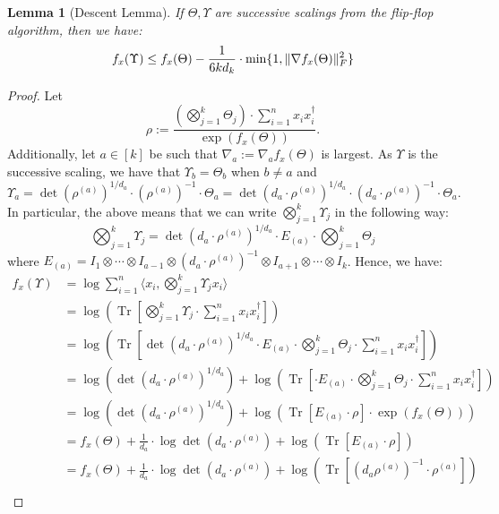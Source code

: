 \documentclass[aos]{imsart}
\newtheorem{lemma}[theorem]{Lemma}
\theoremstyle{definition}
\DeclareMathOperator{\tr}{Tr}
\DeclarePairedDelimiter{\norm}{\lVert}{\rVert}
\begin{document}
\begin{lemma}[Descent Lemma]\label{lem:tensor-descent-lemma}
	If $\Theta, \Upsilon$ are successive scalings from the flip-flop algorithm, then we have:
	$$ f_x(\Upsilon) \leq f_x(\Theta) - \dfrac{1}{6k d_k} \cdot \min\{1, \norm{\nabla f_x(\Theta)}_F^2\} $$
\end{lemma}

\begin{proof}
	Let
	$$\rho := \dfrac{\left( \bigotimes_{j=1}^k \Theta_j \right) \cdot \sum_{i=1}^n x_i x_i^\dagger}{\exp(f_x(\Theta))}.$$
	Additionally, let $a \in [k]$ be such that $\nabla_a := \nabla_a f_x(\Theta)$ is largest. As $\Upsilon$ is the successive scaling, we have that $\Upsilon_b = \Theta_b$ when $b \neq a$ and
	$$ \Upsilon_a = \det(\rho^{(a)})^{1/d_a} \cdot (\rho^{(a)})^{-1} \cdot \Theta_a = \det(d_a \cdot \rho^{(a)})^{1/d_a} \cdot (d_a \cdot \rho^{(a)})^{-1} \cdot \Theta_a. $$
	In particular, the above means that we can write $\bigotimes_{j=1}^k \Upsilon_j$ in the following way:
	$$ \bigotimes_{j=1}^k \Upsilon_j = \det(d_a \cdot \rho^{(a)})^{1/d_a} \cdot E_{(a)} \cdot \bigotimes_{j=1}^k \Theta_j $$
	where $E_{(a)} = I_1 \otimes \cdots \otimes I_{a-1} \otimes (d_a \cdot \rho^{(a)})^{-1} \otimes I_{a+1} \otimes \cdots \otimes I_k$.
	Hence, we have:
	\begin{align*}
		f_x(\Upsilon) &= \log \sum_{i=1}^n \langle x_i , \bigotimes_{j=1}^k \Upsilon_j x_i \rangle \\
		&= \log\left(\tr\left[ \bigotimes_{j=1}^k \Upsilon_j \cdot  \sum_{i=1}^n x_i x_i^\dagger  \right]\right) \\
		&= \log\left(\tr\left[ \det(d_a \cdot \rho^{(a)})^{1/d_a} \cdot E_{(a)} \cdot \bigotimes_{j=1}^k \Theta_j \cdot  \sum_{i=1}^n x_i x_i^\dagger  \right]\right) \\
		&= \log\left(\det(d_a \cdot \rho^{(a)})^{1/d_a} \right) +  \log\left(\tr\left[ \cdot E_{(a)} \cdot \bigotimes_{j=1}^k \Theta_j \cdot  \sum_{i=1}^n x_i x_i^\dagger  \right]\right) \\
		&= \log\left(\det(d_a \cdot \rho^{(a)})^{1/d_a} \right) +  \log\left(\tr\left[ E_{(a)} \cdot \rho \right] \cdot \exp(f_x(\Theta)) \right) \\
		&= f_x(\Theta) + \frac{1}{d_a} \cdot  \log\det(d_a \cdot \rho^{(a)})  +  \log\left(\tr\left[ E_{(a)} \cdot \rho \right] \right) \\
		&= f_x(\Theta) + \frac{1}{d_a} \cdot  \log\det(d_a \cdot \rho^{(a)})  +  \log\left(\tr\left[ (d_a \rho^{(a)})^{-1} \cdot \rho^{(a)} \right] \right) \\

\end{align*}
\end{proof}
\end{document}
